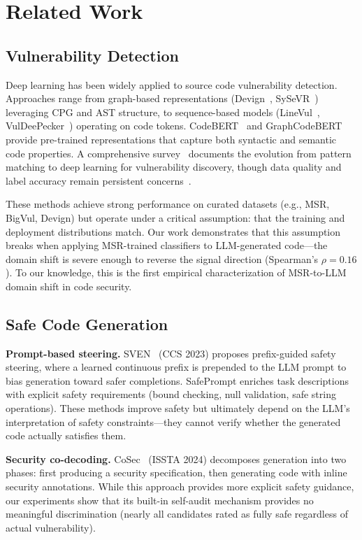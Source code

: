 \documentclass[10pt,conference]{IEEEtran}
\begin{document}
\section{Related Work}

\subsection{Vulnerability Detection}

Deep learning has been widely applied to source code vulnerability detection. Approaches range from graph-based representations (Devign~\cite{devign}, SySeVR~\cite{sysevr}) leveraging CPG and AST structure, to sequence-based models (LineVul~\cite{linevul}, VulDeePecker~\cite{vuldeepecker}) operating on code tokens. CodeBERT~\cite{codebert} and GraphCodeBERT~\cite{graphcodebert} provide pre-trained representations that capture both syntactic and semantic code properties. A comprehensive survey~\cite{vuldetectionsurvey,llmsecuritysurvey} documents the evolution from pattern matching to deep learning for vulnerability discovery, though data quality and label accuracy remain persistent concerns~\cite{primevul}.

These methods achieve strong performance on curated datasets (e.g., MSR, BigVul, Devign) but operate under a critical assumption: that the training and deployment distributions match. Our work demonstrates that this assumption breaks when applying MSR-trained classifiers to LLM-generated code---the domain shift is severe enough to reverse the signal direction (Spearman's $\rho=0.16$). To our knowledge, this is the first empirical characterization of MSR-to-LLM domain shift in code security.

\subsection{Safe Code Generation}

\textbf{Prompt-based steering.} SVEN~\cite{sven} (CCS 2023) proposes prefix-guided safety steering, where a learned continuous prefix is prepended to the LLM prompt to bias generation toward safer completions. SafePrompt enriches task descriptions with explicit safety requirements (bound checking, null validation, safe string operations). These methods improve safety but ultimately depend on the LLM's interpretation of safety constraints---they cannot verify whether the generated code actually satisfies them.

\textbf{Security co-decoding.} CoSec~\cite{cosec} (ISSTA 2024) decomposes generation into two phases: first producing a security specification, then generating code with inline security annotations. While this approach provides more explicit safety guidance, our experiments show that its built-in self-audit mechanism provides no meaningful discrimination (nearly all candidates rated as fully safe regardless of actual vulnerability).
\end{document}
